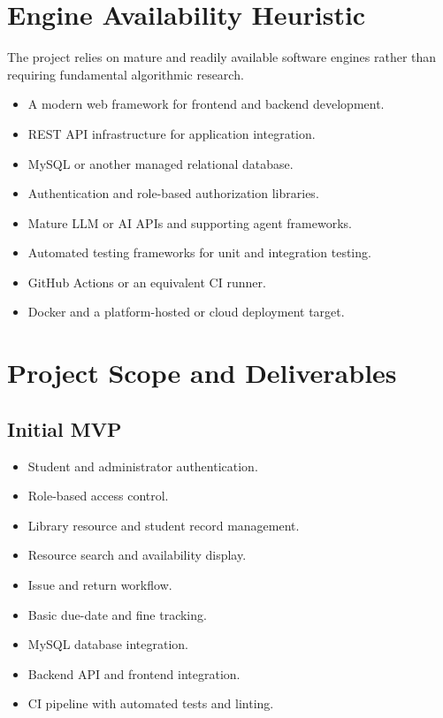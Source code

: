 \documentclass[11pt]{article}
\begin{document}
\section{Engine Availability Heuristic}
The project relies on mature and readily available software engines rather than requiring fundamental algorithmic research.
\begin{itemize}
    \item A modern web framework for frontend and backend development.
    \item REST API infrastructure for application integration.
    \item MySQL or another managed relational database.
    \item Authentication and role-based authorization libraries.
    \item Mature LLM or AI APIs and supporting agent frameworks.
    \item Automated testing frameworks for unit and integration testing.
    \item GitHub Actions or an equivalent CI runner.
    \item Docker and a platform-hosted or cloud deployment target.
\end{itemize}

\section{Project Scope and Deliverables}
\subsection{Initial MVP}
\begin{itemize}
    \item Student and administrator authentication.
    \item Role-based access control.
    \item Library resource and student record management.
    \item Resource search and availability display.
    \item Issue and return workflow.
    \item Basic due-date and fine tracking.
    \item MySQL database integration.
    \item Backend API and frontend integration.
    \item CI pipeline with automated tests and linting.
\end{itemize}
\end{document}

